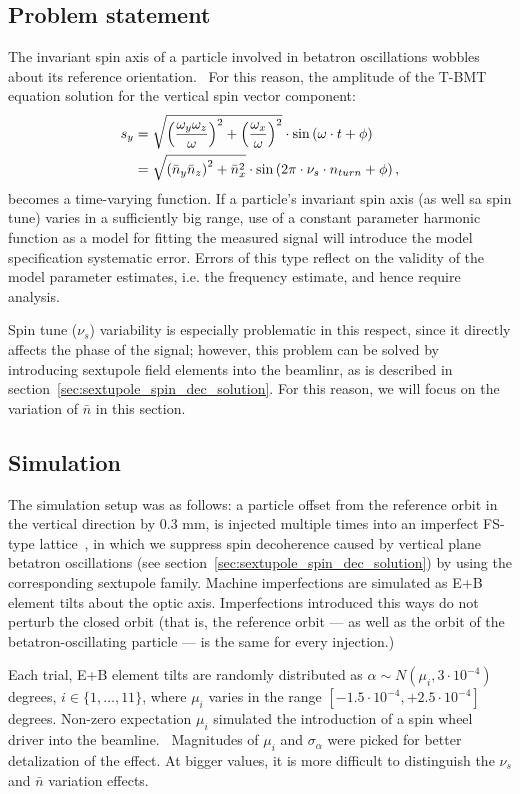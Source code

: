 
\subsection{Problem statement}
The invariant spin axis of a particle involved in betatron oscillations wobbles
about its reference orientation.~\cite[p.~11]{Shatunov} For this reason, the amplitude of the T-BMT equation
solution for the vertical spin vector component:
\begin{align}
s_y &= \sqrt{\bkt{\frac{\w_y\w_z}{\w}}^2 + \bkt{\frac{\w_x}{\w}}^2}\cdot\sin\bkt{\w\cdot t + \phi}\notag\\
&= \sqrt{\bkt{\bar n_y\bar n_z}^2 + \bar n_x^2} \cdot \sin\bkt{2\pi\cdot\nu_s\cdot n_{turn} + \phi},\label{eq:sy_varying_amplitude}
\end{align}
becomes a time-varying function. If a particle's invariant spin axis (as well sa spin tune) varies in
a sufficiently big range, use of a constant parameter harmonic function as a model
for fitting the measured signal will introduce the model specification systematic error.
Errors of this type reflect on the validity of the model parameter estimates, i.e. the frequency estimate,
and hence require analysis.

Spin tune ($\nu_s$) variability is especially problematic in this respect,
since it directly affects the phase of the signal; however, this problem can be solved
by introducing sextupole field elements into the beamlinr, as is described
in section~\ref{sec:sextupole_spin_dec_solution}. For this reason, we will focus on the variation of
$\bar n$ in this section.

\subsection{Simulation}
The simulation setup was as follows: a particle offset from the reference orbit in the vertical direction
by 0.3 mm, is injected multiple times into an imperfect FS-type lattice~\cite{Senichev:Lattices},
in which we suppress spin decoherence caused by vertical plane betatron oscillations
(see section~\ref{sec:sextupole_spin_dec_solution})  by using the corresponding sextupole family.
Machine imperfections are simulated as E+B element tilts about the optic axis.
Imperfections introduced this ways do not perturb the closed orbit (that is,
the reference orbit --- as well as the orbit of the betatron-oscillating particle ---
is the same for every injection.)

Each trial, E+B element tilts are randomly distributed as $\alpha\sim N(\mu_i, 3\cdot 10^{-4})$ degrees,
$i\in\{1,\dots,11\}$, where $\mu_i$ varies in the range $[-1.5\cdot10^{-4}, +2.5\cdot10^{-4}]$ degrees.
Non-zero expectation $\mu_i$ simulated the introduction of a spin wheel driver
into the beamline.~\cite{Koop:SpinWheel} Magnitudes of $\mu_i$ and $\sigma_{\alpha}$
were picked for better detalization of the effect. At bigger values, it is more difficult to distinguish
the $\nu_s$ and $\bar n$ variation effects.

